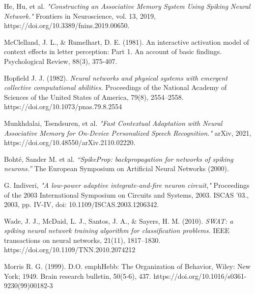 \begin{thebibliography}{99}

	He, Hu, et al. \emph{"Constructing an Associative Memory System Using Spiking Neural Network."} Frontiers in Neuroscience, vol. 13, 2019, https://doi.org/10.3389/fnins.2019.00650.
	
	McClelland, J. L., \& Rumelhart, D. E. (1981). An interactive activation model of context effects in letter perception: Part 1. An account of basic findings. Psychological Review, 88(3), 375-407.
	
	Hopfield J. J. (1982). \emph{Neural networks and physical systems with emergent collective computational abilities.} Proceedings of the National Academy of Sciences of the United States of America, 79(8), 2554–2558. https://doi.org/10.1073/pnas.79.8.2554

	Munkhdalai, Tsendsuren, et al. \emph{"Fast Contextual Adaptation with Neural Associative Memory for On-Device Personalized Speech Recognition."} arXiv, 2021, https://doi.org/10.48550/arXiv.2110.02220.

	Bohté, Sander M. et al. \emph{“SpikeProp: backpropagation for networks of spiking neurons.”} The European Symposium on Artificial Neural Networks (2000).

	G. Indiveri, \emph{"A low-power adaptive integrate-and-fire neuron circuit,"} Proceedings of the 2003 International Symposium on Circuits and Systems, 2003. ISCAS '03., 2003, pp. IV-IV, doi: 10.1109/ISCAS.2003.1206342.

	Wade, J. J., McDaid, L. J., Santos, J. A., \& Sayers, H. M. (2010). \emph{SWAT: a spiking neural network training algorithm for classification problems.} IEEE transactions on neural networks, 21(11), 1817–1830. https://doi.org/10.1109/TNN.2010.2074212

	Morris R. G. (1999). D.O. emph{Hebb: The Organization of Behavior,} Wiley: New York; 1949. Brain research bulletin, 50(5-6), 437. https://doi.org/10.1016/s0361-9230(99)00182-3

\end{thebibliography}